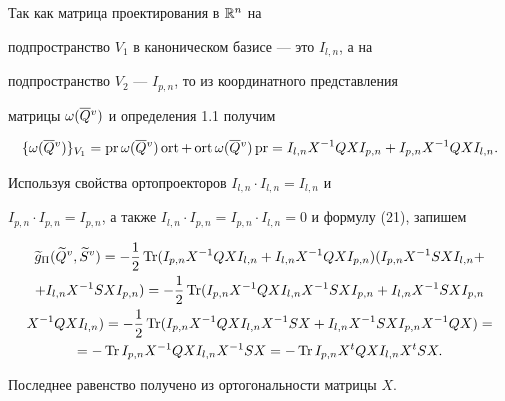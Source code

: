\begin{pf} Так как матрица проектирования в $\Bbb R^n$ на


подпространство $V_1$ в каноническом базисе --- это $I_{l,n}$, а на


подпространство $V_2$ --- $I_{p,n}$, то из координатного представления


матрицы $\omega (\overline {Q}{}^v)$ и определения 1.1 получим


$$


\{ \w (\olv Q)\} _{V_1}=\pr \w (\olv Q)\ort +\ort \w (\olv Q)\pr =


I_{l,n}X^{-1}QXI_{p,n}+I_{p,n}X^{-1}QXI_{l,n}.


$$


Используя свойства ортопроекторов $I_{l,n}\cdot I_{l,n}=I_{l,n}$ и


$I_{p,n}\cdot I_{p,n}=I_{p,n}$, а также $I_{l,n}\cdot I_{p,n}=I_{p,n}\cdot


I_{l,n}=0$ и формулу (21), запишем


\begin{gather*}


\g g_\Pi (\grv Q,\grv S)=-\1 \Tr (I_{p,n}X^{-1}QXI_{l,n}+I_{l,n}X^{-1}


QXI_{p,n})(I_{p,n}X^{-1}SXI_{l,n}+\\


+I_{l,n}X^{-1}SXI_{p,n})=-\1 \Tr (I_{p,n}X^{-1}QXI_{l,n}X^{-1}SXI_{p,n}


+I_{l,n}X^{-1}SXI_{p,n}\\


X^{-1}QXI_{l,n})=-\1 \Tr(I_{p,n}X^{-1}QXI_{l,n}X^{-1}SX+I_{l,n}X^{-1}


SXI_{p,n}X^{-1}QX)=\\


=-\Tr I_{p,n}X^{-1}QXI_{l,n}X^{-1}SX=-\Tr I_{p,n}X^tQXI_{l,n}X^tSX.


\end{gather*}


Последнее равенство получено из ортогональности матрицы $X$.


\end{pf}





